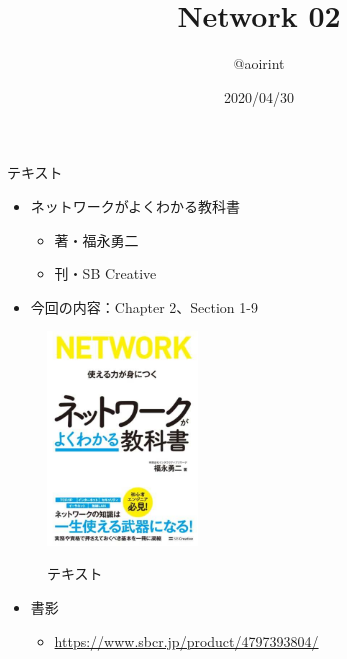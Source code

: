 \documentclass[12pt,aspectratio=169]{beamer}
\title{Network 02}
\author{@aoirint}
\date{2020/04/30}
\begin{document}
\frame{\maketitle}

\begin{frame}{テキスト}

  \begin{minipage}{0.58\textwidth}
    \begin{itemize}
      \item ネットワークがよくわかる教科書
      \begin{itemize}
        \item 著・福永勇二
        \item 刊・SB Creative
      \end{itemize}
      \item 今回の内容：Chapter 2、Section 1-9
    \end{itemize}
  \end{minipage}
  \hfill
  \begin{minipage}{0.38\textwidth}
    \vspace{-1\baselineskip}
    \begin{figure}[h]
      \centering
      \includegraphics[width=4cm,bb=0 0 420 596]{./figures/networkbook.jpg}
      \label{fig:networkbook}
      \caption{テキスト}
    \end{figure}
  \end{minipage}

  \begin{itemize}
    \item 書影
    \begin{itemize}
      \item { \small \url{https://www.sbcr.jp/product/4797393804/} }
    \end{itemize}
  \end{itemize}

\end{frame}
\end{document}
